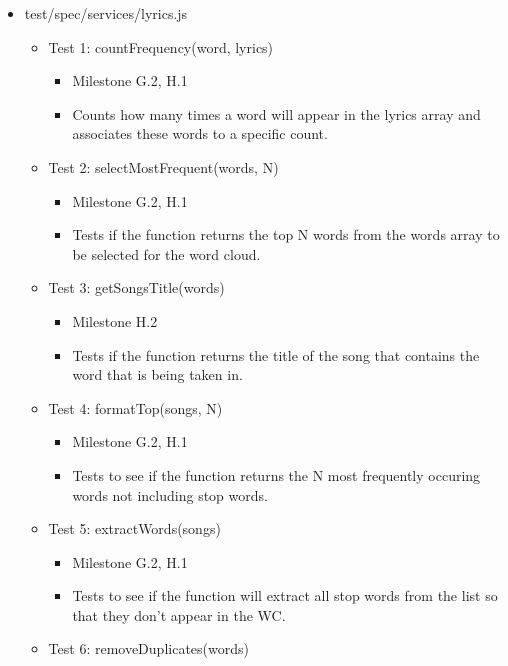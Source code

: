 \documentclass[]{article}
\begin{document}
\begin{itemize}
\itemsep1pt\parskip0pt
\item
  test/spec/services/lyrics.js

  \begin{itemize}
  \itemsep1pt\parskip0pt
  \item
    Test 1: countFrequency(word, lyrics)

    \begin{itemize}
    \itemsep1pt\parskip0pt
    \item
      Milestone G.2, H.1
    \item
      Counts how many times a word will appear in the lyrics array and
      associates these words to a specific count.
    \end{itemize}
  \item
    Test 2: selectMostFrequent(words, N)

    \begin{itemize}
    \itemsep1pt\parskip0pt
    \item
      Milestone G.2, H.1
    \item
      Tests if the function returns the top N words from the words array
      to be selected for the word cloud.
    \end{itemize}
  \item
    Test 3: getSongsTitle(words)

    \begin{itemize}
    \itemsep1pt\parskip0pt
    \item
      Milestone H.2
    \item
      Tests if the function returns the title of the song that contains
      the word that is being taken in.
    \end{itemize}
  \item
    Test 4: formatTop(songs, N)

    \begin{itemize}
    \itemsep1pt\parskip0pt
    \item
      Milestone G.2, H.1
    \item
      Tests to see if the function returns the N most frequently
      occuring words not including stop words.
    \end{itemize}
  \item
    Test 5: extractWords(songs)

    \begin{itemize}
    \itemsep1pt\parskip0pt
    \item
      Milestone G.2, H.1
    \item
      Tests to see if the function will extract all stop words from the
      list so that they don't appear in the WC.
    \end{itemize}
  \item
    Test 6: removeDuplicates(words)


\end{itemize}
\end{itemize}
\end{document}
